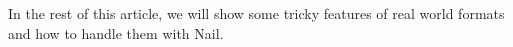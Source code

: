 In the rest of this article, we will show some tricky features of real world formats and how to
handle them with Nail.




